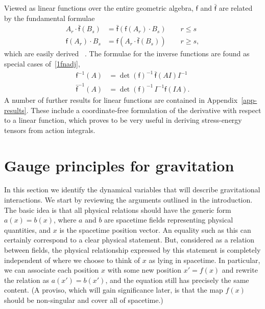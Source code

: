 \documentclass[a4paper]{article}
\numberwithin{equation}{section}
\newcommand{\dt}{\! \cdot \!}
\newcommand{\lif}{\mathsf{f}}
\newcommand{\lbf}{\bar{\mathsf{f}}}
\newcommand{\fo}{\lbf}
\newcommand{\fu}{\lif}
\begin{document}
Viewed as linear functions over the entire geometric algebra, $\fu$
and $\fo$ are related by the fundamental formulae
%
\begin{equation}
\begin{aligned}
A_{r} \dt {\lbf}(B_{s}) &= {\lbf}( {\fu}(A_{r}) \dt B_{s}) 
\qquad r \leq s  \\
{\fu}(A_{r}) \dt B_{s} &= {\fu}( A_{r} \dt {\lbf}(B_{s}))
\qquad r \geq s ,
\end{aligned} 
\label{1fnadj}
\end{equation}
%
which are easily derived~ \cite[Chapter 3]{hes-gc}.  The formulae for the
inverse functions are found as special cases of~\eqref{1fnadj},
%
\begin{equation}
\begin{aligned}
{\fu}^{-1}(A) &= \det(\fu)^{-1} \, {\lbf}(A I) I^{-1}  \\
{\lbf}^{-1}(A) &= \det(\fu)^{-1} \, I^{-1} {\fu}(I A) .
\label{1fninv}
\end{aligned}
\end{equation}
%
A number of further results for linear functions are contained in
Appendix~\ref{app-results}.  These include a coordinate-free
formulation of the derivative with respect to a linear function, which
proves to be very useful in deriving stress-energy tensors from action
integrals.




\section{Gauge principles for gravitation}
\label{Gauge}


In this section we identify the dynamical variables that will describe
gravitational interactions.  We start by reviewing the arguments
outlined in the introduction.  The basic idea is that all physical
relations should have the generic form $a(x)=b(x)$, where $a$ and $b$
are spacetime fields representing physical quantities, and $x$ is the
spacetime position vector.  An equality such as this can certainly
correspond to a clear physical statement.  But, considered as a
relation between fields, the physical relationship expressed by this
statement is completely independent of where we choose to think of $x$
as lying in spacetime.  In particular, we can associate each position
$x$ with some new position $x'=f(x)$ and rewrite the relation as
$a(x')=b(x')$, and the equation still has precisely the same content.
(A proviso, which will gain significance later, is that the map $f(x)$
should be non-singular and cover all of spacetime.)
\end{document}
